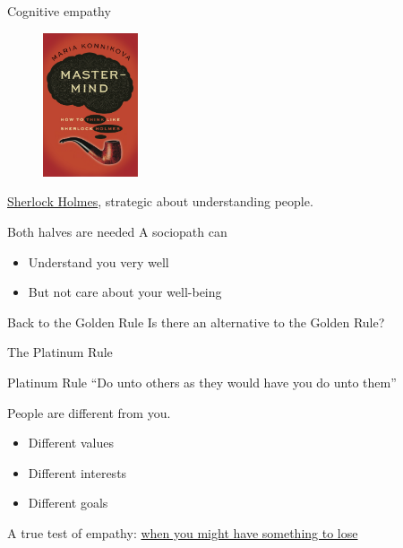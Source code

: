 \begin{frame}{Cognitive empathy}
  \begin{figure}
    \includegraphics[width=0.25\textwidth]{Mastermind-cover-new-pipe.jpg}
  \end{figure}

  \href{http://aeon.co/magazine/psychology/maria-konnikova-empathy-sherlock-holmes/}{Sherlock
    Holmes}, strategic about understanding people.
\end{frame}

\begin{frame}{Both halves are needed}
  A sociopath can
  \begin{itemize}
  \item Understand you very well
  \item But not care about your well-being
  \end{itemize}
\end{frame}

\begin{frame}{Back to the Golden Rule}
  Is there an alternative to the Golden Rule?
\end{frame}

\begin{frame}{The Platinum Rule}
  \begin{block}{Platinum Rule}
    ``Do unto others as they would have you do unto them''
  \end{block}

  People are different from you.
  \begin{itemize}
  \item Different values
  \item Different interests
  \item Different goals
  \end{itemize}

  A true test of empathy: \href{http://www.progressiveimpact.org/a-true-test-of-empathy-towards-others/}{when you might have something to lose}
\end{frame}

